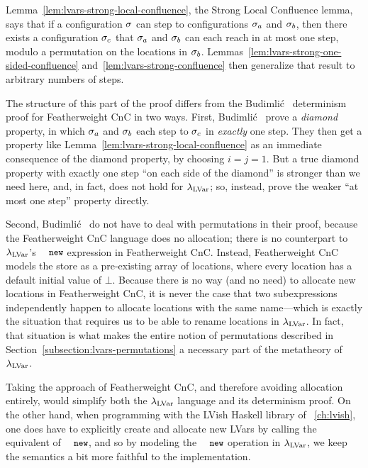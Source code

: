 Lemma~\ref{lem:lvars-strong-local-confluence}, the Strong Local
Confluence lemma, says that if a configuration $\sigma$ can step to
configurations $\sigma_a$ and $\sigma_b$, then there exists a
configuration $\sigma_c$ that $\sigma_a$ and $\sigma_b$ can each reach in
at most one step, modulo a permutation on the locations in $\sigma_b$.
Lemmas~\ref{lem:lvars-strong-one-sided-confluence}
and~\ref{lem:lvars-strong-confluence} then generalize that result to
arbitrary numbers of steps.

The structure of this part of the proof differs from the Budimli\'c
\etal~determinism proof for Featherweight CnC in two ways.  First,
Budimli\'c \etal~prove a \emph{diamond} property, in which $\sigma_a$
and $\sigma_b$ each step to $\sigma_c$ in \emph{exactly} one step.  They
then get a property like Lemma~\ref{lem:lvars-strong-local-confluence}
as an immediate consequence of the diamond property, by choosing $i =
j = 1$.  But a true diamond property with exactly one step ``on each
side of the diamond'' is stronger than we need here, and, in fact,
does not hold for $\lambda_{\textrm{LVar}}$; so, instead,  prove the weaker ``at
most one step'' property directly.

Second, Budimli\'c \etal~do not have to deal with permutations in
their proof, because the Featherweight CnC language does no
allocation; there is no counterpart to $\lambda_{\textrm{LVar}}$'s $\NEW$
expression in Featherweight CnC.  Instead, Featherweight CnC models
the store as a pre-existing array of locations, where every location
has a default initial value of $\bot$.  Because there is no way (and
no need) to allocate new locations in Featherweight CnC, it is never
the case that two subexpressions independently happen to allocate
locations with the same name---which is exactly the situation that
requires us to be able to rename locations in $\lambda_{\textrm{LVar}}$.  In fact,
that situation is what makes the entire notion of permutations
described in Section~\ref{subsection:lvars-permutations} a necessary
part of the metatheory of $\lambda_{\textrm{LVar}}$.

Taking the approach of Featherweight CnC, and therefore avoiding
allocation entirely, would simplify both the $\lambda_{\textrm{LVar}}$ language
and its determinism proof.  On the other hand, when programming with
the LVish Haskell library of ~\ref{ch:lvish}, one does have to
explicitly create and allocate new LVars by calling the equivalent of
$\NEW$, and so by modeling the $\NEW$ operation in $\lambda_{\textrm{LVar}}$, we
keep the semantics a bit more faithful to the implementation.

